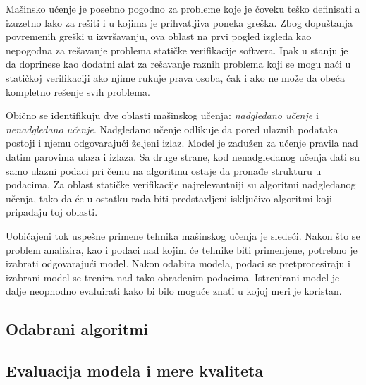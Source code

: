 \documentclass[a4paper]{article}
\begin{document}

Mašinsko učenje je posebno pogodno za probleme koje je čoveku teško definisati a 
izuzetno lako za rešiti i u kojima je prihvatljiva poneka greška. Zbog dopuštanja 
povremenih greški u izvršavanju, ova oblast na prvi pogled izgleda kao nepogodna 
za rešavanje problema statičke verifikacije softvera. Ipak u stanju je da doprinese 
kao dodatni alat za rešavanje raznih problema koji se mogu naći u statičkoj 
verifikaciji ako njime rukuje prava osoba, čak i ako ne može da obeća kompletno 
rešenje svih problema.

Obično se identifikuju dve oblasti mašinskog učenja: \textit{nadgledano učenje} i 
\textit{nenadgledano učenje}. Nadgledano učenje odlikuje da pored ulaznih podataka 
postoji i njemu odgovarajući željeni izlaz. Model je zadužen za učenje pravila nad 
datim parovima ulaza i izlaza. Sa druge strane, kod nenadgledanog učenja dati su 
samo ulazni podaci pri čemu na algoritmu ostaje da pronađe strukturu u podacima. 
Za oblast statičke verifikacije najrelevantniji su algoritmi nadgledanog učenja, 
tako da će u ostatku rada biti predstavljeni isključivo algoritmi koji pripadaju toj oblasti.

Uobičajeni tok uspešne primene tehnika mašinskog učenja je sledeći. Nakon što se 
problem analizira, kao i podaci nad kojim će tehnike biti primenjene, potrebno je 
izabrati odgovarajući model. Nakon odabira modela, podaci se pretprocesiraju i 
izabrani model se trenira nad tako obrađenim podacima. Istrenirani model je dalje 
neophodno evaluirati kako bi bilo moguće znati u kojoj meri je koristan.

\subsection{Odabrani algoritmi}



\subsection{Evaluacija modela i mere kvaliteta}

\end{document}
